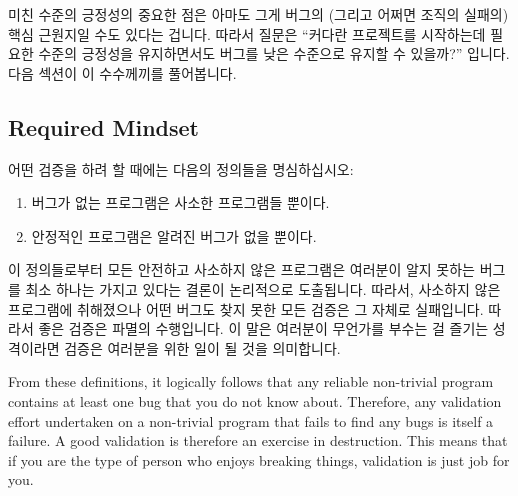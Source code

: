 미친 수준의 긍정성의 중요한 점은 아마도 그게 버그의 (그리고 어쩌면 조직의
실패의) 핵심 근원지일 수도 있다는 겁니다.
따라서 질문은 ``커다란 프로젝트를 시작하는데 필요한 수준의 긍정성을
유지하면서도 버그를 낮은 수준으로 유지할 수 있을까?'' 입니다.
다음 섹션이 이 수수께끼를 풀어봅니다.

\subsection{Required Mindset}
\label{sec:debugging:Required Mindset}

어떤 검증을 하려 할 때에는 다음의 정의들을 명심하십시오:

\begin{enumerate}
\item	버그가 없는 프로그램은 사소한 프로그램들 뿐이다.
\item	안정적인 프로그램은 알려진 버그가 없을 뿐이다.
\end{enumerate}

이 정의들로부터 모든 안전하고 사소하지 않은 프로그램은 여러분이 알지 못하는
버그를 최소 하나는 가지고 있다는 결론이 논리적으로 도출됩니다.
따라서, 사소하지 않은 프로그램에 취해졌으나 어떤 버그도 찾지 못한 모든 검증은
그 자체로 실패입니다.
따라서 좋은 검증은 파멸의 수행입니다.
이 말은 여러분이 무언가를 부수는 걸 즐기는 성격이라면 검증은 여러분을 위한 일이
될 것을 의미합니다.

\iffalse

From these definitions, it logically follows that any reliable
non-trivial program contains at least one bug that you do not
know about.
Therefore, any validation effort undertaken on a non-trivial program
that fails to find any bugs is itself a failure.
A good validation is therefore an exercise in destruction.
This means that if you are the type of person who enjoys breaking things,
validation is just job for you.

